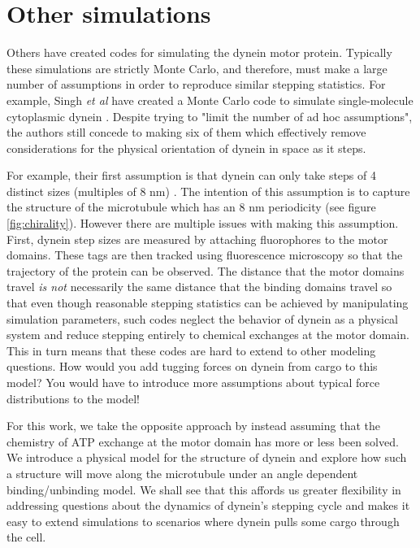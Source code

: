 \section{Other simulations} 
Others have created codes for simulating the dynein motor protein. Typically these simulations are strictly Monte Carlo, and therefore, must make a large number of assumptions in order to reproduce similar stepping statistics. For example, Singh \textit{et al} have created a Monte Carlo code to simulate single-molecule cytoplasmic dynein \cite{singh2005monte}. Despite trying to "limit the number of ad hoc assumptions", the authors still concede to making six of them which effectively remove considerations for the physical orientation of dynein in space as it steps. 

For example, their first assumption is that dynein can only take steps of 4 distinct sizes (multiples of 8 nm)  \cite{singh2005monte}.  The intention of this assumption is to capture the structure of the microtubule which has an 8 nm periodicity (see figure \ref{fig:chirality}). However there are multiple issues with making this assumption. First, dynein step sizes are measured by attaching fluorophores to the motor domains. These tags are then tracked using fluorescence microscopy so that the trajectory of the protein can be observed. The distance that the motor domains travel \textit{is not} necessarily the same distance that the binding domains travel so that even though reasonable stepping statistics can be achieved by manipulating simulation parameters, such codes neglect the behavior of dynein as a physical system and reduce stepping entirely to chemical exchanges at the motor domain. This in turn means that these codes are hard to extend to other modeling questions. How would you add tugging forces on dynein from cargo to this model? You would have to introduce more assumptions about typical force distributions to the model! 

For this work, we take the opposite approach  by instead assuming that the chemistry of ATP exchange at the motor domain has more or less been solved. We introduce a physical model for the structure of dynein and explore how such a structure will move along the microtubule under an angle dependent binding/unbinding model. We shall see that this affords us greater flexibility in addressing questions about the dynamics of dynein's stepping cycle and makes it easy to extend simulations to scenarios where dynein pulls some cargo through the cell. 





















